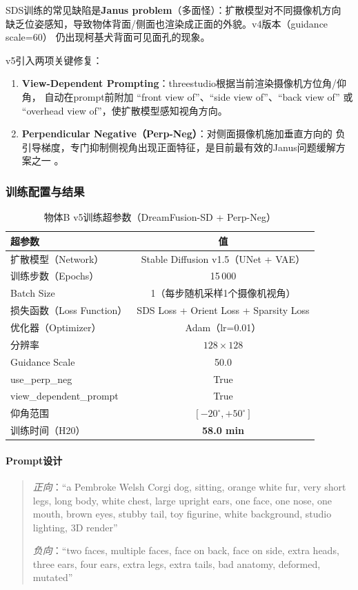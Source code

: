 \documentclass{article}
\begin{document}
SDS训练的常见缺陷是\textbf{Janus problem}（多面怪）：扩散模型对不同摄像机方向
缺乏位姿感知，导致物体背面/侧面也渲染成正面的外貌。v4版本（guidance scale=60）
仍出现柯基犬背面可见面孔的现象。

v5引入两项关键修复：
\begin{enumerate}
  \item \textbf{View-Dependent Prompting}：threestudio根据当前渲染摄像机方位角/仰角，
        自动在prompt前附加 ``front view of''、``side view of''、``back view of'' 或
        ``overhead view of''，使扩散模型感知视角方向。
  \item \textbf{Perpendicular Negative（Perp-Neg）}：对侧面摄像机施加垂直方向的
        负引导梯度，专门抑制侧视角出现正面特征，是目前最有效的Janus问题缓解方案之一
        \cite{armandpour2023re}。
\end{enumerate}

\subsubsection{训练配置与结果}

\begin{table}[h]
  \centering
  \caption{物体B v5训练超参数（DreamFusion-SD + Perp-Neg）}
  \label{tab:objB_config}
  \begin{tabular}{lc}
    \toprule
    超参数 & 值 \\
    \midrule
    扩散模型（Network） & Stable Diffusion v1.5（UNet + VAE）\\
    训练步数（Epochs） & 15\,000 \\
    Batch Size & 1（每步随机采样1个摄像机视角）\\
    损失函数（Loss Function） & SDS Loss + Orient Loss + Sparsity Loss \\
    优化器（Optimizer） & Adam（lr=0.01）\\
    分辨率 & $128\times128$ \\
    Guidance Scale & 50.0 \\
    use\_perp\_neg & True \\
    view\_dependent\_prompt & True \\
    仰角范围 & $[-20^\circ, +50^\circ]$ \\
    训练时间（H20） & \textbf{58.0 min} \\
    \bottomrule
  \end{tabular}
\end{table}

\paragraph{Prompt设计}
\begin{quote}\small
\textit{正向}：``a Pembroke Welsh Corgi dog, sitting, orange white fur, very short
legs, long body, white chest, large upright ears, one face, one nose, one mouth,
brown eyes, stubby tail, toy figurine, white background, studio lighting, 3D render''

\textit{负向}：``two faces, multiple faces, face on back, face on side, extra heads,
three ears, four ears, extra legs, extra tails, bad anatomy, deformed, mutated''
\end{quote}
\end{document}
